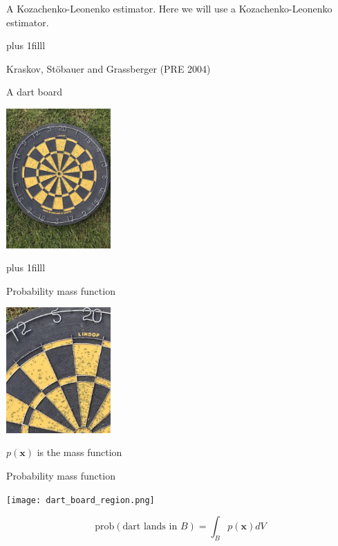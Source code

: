 \documentclass{beamer}
\newcommand{\btVFill}{\vskip0pt plus 1filll}
\begin{document}
\begin{frame}{A Kozachenko-Leonenko estimator.}
\vskip 3cm
  Here we will use a Kozachenko-Leonenko estimator.

  \btVFill
  \begin{flushright}
    \color{gray}
    \tiny{Kraskov, St\"{o}bauer and Grassberger (PRE 2004)}
    \color{black}
\end{flushright}
\end{frame}


\begin{frame}{A dart board}
\color{reddish}
\begin{center}
\includegraphics[width=4cm]{dart_board.jpg}
\end{center}
\color{black}
\btVFill
\color{gray}
\color{black}
\end{frame}

\begin{frame}{Probability mass function}
\color{reddish}
\begin{center}
\includegraphics[width=4cm]{dart_board_zoom.png}
\end{center}
\begin{center}
\color{black}
$p(\mathbf{x})$ is the mass function
\end{center}
\color{black}
\end{frame}


\begin{frame}{Probability mass function}
\begin{center}
\texttt{[image: dart\_board\_region.png]}
\end{center}
\color{dark}
$$\mbox{prob}(\mbox{dart lands in }B)=\int_B p(\mathbf{x})dV$$
\color{black}
\end{frame}
\end{document}
